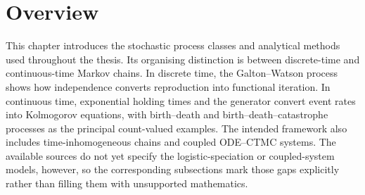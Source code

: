 \section{Overview}\label{m:sec:overview}

This chapter introduces the stochastic process classes and analytical methods used
throughout the thesis.  Its organising distinction is between discrete-time and
continuous-time Markov chains.  In discrete time, the Galton--Watson process shows
how independence converts reproduction into functional iteration.  In continuous
time, exponential holding times and the generator convert event rates into
Kolmogorov equations, with birth--death and birth--death--catastrophe processes as
the principal count-valued examples.  The intended framework also includes
time-inhomogeneous chains and coupled ODE--CTMC systems.  The available sources do
not yet specify the logistic-speciation or coupled-system models, however, so the
corresponding subsections mark those gaps explicitly rather than filling them with
unsupported mathematics.
